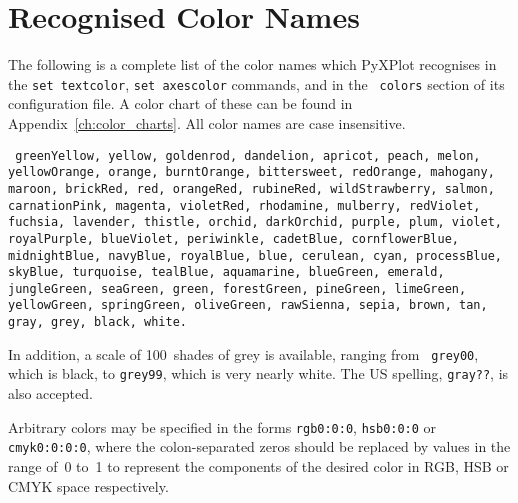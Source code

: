 \section{Recognised Color Names}
\label{sec:color_names}

The following is a complete list of the color names which PyXPlot recognises
in the {\tt set textcolor}, {\tt set axescolor} commands, and in the {\tt
colors} section of its configuration file.  A color chart of these can be
found in Appendix~\ref{ch:color_charts}.  All color names are case
insensitive.

\vspace{5mm}\noindent
{}
{\tt
greenYellow, yellow, goldenrod, dandelion, apricot, peach, melon,\newline\noindent
yellowOrange, orange, burntOrange, bittersweet, redOrange,\newline\noindent
mahogany, maroon, brickRed, red, orangeRed, rubineRed,\newline\noindent
wildStrawberry, salmon, carnationPink, magenta, violetRed,\newline\noindent
rhodamine, mulberry, redViolet, fuchsia, lavender, thistle,\newline\noindent
orchid, darkOrchid, purple, plum, violet, royalPurple,\newline\noindent
blueViolet, periwinkle, cadetBlue, cornflowerBlue, midnightBlue,\newline\noindent
navyBlue, royalBlue, blue, cerulean, cyan, processBlue, skyBlue,\newline\noindent
turquoise, tealBlue, aquamarine, blueGreen, emerald, jungleGreen,\newline\noindent
seaGreen, green, forestGreen, pineGreen, limeGreen, yellowGreen,\newline\noindent
springGreen, oliveGreen, rawSienna, sepia, brown, tan, gray,\newline\noindent
grey, black, white.
}

\vspace{5mm}
In addition, a scale of 100~shades of grey is available, ranging from {\tt
grey00}, which is black, to {\tt grey99}, which is very nearly white.  The US
spelling, {\tt gray??}, is also accepted.

Arbitrary colors may be specified in the forms {\tt rgb0:0:0}, {\tt hsb0:0:0}
or {\tt cmyk0:0:0:0}, where the colon-separated zeros should be replaced by
values in the range of~0 to~1 to represent the components of the desired color
in RGB, HSB or CMYK space
respectively.

